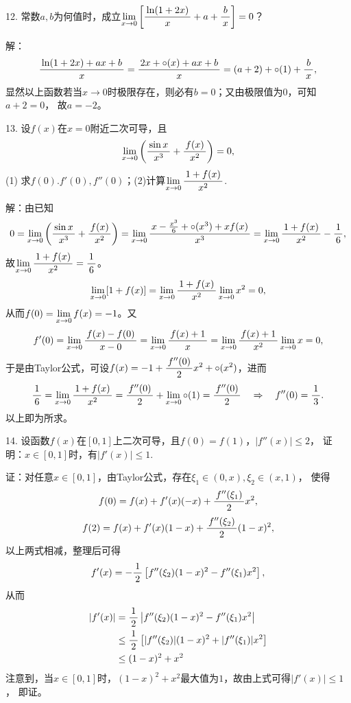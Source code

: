 12. 常数$a,b$为何值时，成立$\limx0\left[\df{\ln(1+2x)}{x}+a
+\df bx\right]=0$？

解：
$$\df{\ln(1+2x)+ax+b}{x}=\df{2x+\circ(x)+ax+b}x=(a+2)+\circ(1)+\df bx,$$
显然以上函数若当$x\to0$时极限存在，则必有$b=0$；又由极限值为$0$，可知$a+2=0$，
故$a=-2$。

\bigskip

13. 设$f(x)$在$x=0$附近二次可导，且
$$\limx0\left(\df{\sin x}{x^3}+\df{f(x)}{x^2}\right)=0,$$
(1) 求$f(0).f'(0),f''(0)$；(2)计算$\limx0\df{1+f(x)}{x^2}$.

解：由已知
$$0=\limx0\left(\df{\sin x}{x^3}+\df{f(x)}{x^2}\right)
=\limx0\df{x-\frac{x^3}6+\circ(x^3)+xf(x)}{x^3}
=\limx0\df{1+f(x)}{x^2}-\df16,$$
故$\limx0\df{1+f(x)}{x^2}=\df16$。
$$\limx0[1+f(x)]=\limx0\df{1+f(x)}{x^2}\limx0x^2=0,$$
从而$f(0)=\limx0f(x)=-1$。又
$$f'(0)=\limx0\df{f(x)-f(0)}{x-0}=\limx0\df{f(x)+1}{x}
=\limx0\df{f(x)+1}{x^2}\limx0x=0,$$
于是由Taylor公式，可设$f(x)=-1+\df{f''(0)}2x^2+\circ(x^2)$，进而
$$\df16=\limx0\df{1+f(x)}{x^2}=\df{f''(0)}2+\limx0\circ(1)
=\df{f''(0)}2\quad\Rightarrow\quad f''(0)=\df13.$$
以上即为所求。

\bigskip

14. 设函数$f(x)$在$[0,1]$上二次可导，且$f(0)=f(1)$，$|f''(x)|\leq2$，
证明：$x\in[0,1]$时，有$|f'(x)|\leq 1$.

证：对任意$x\in[0,1]$，由Taylor公式，存在$\xi_1\in(0,x),\xi_2\in(x,1)$，
使得
$$f(0)=f(x)+f'(x)(-x)+\df{f''(\xi_1)}2x^2,$$
$$f(2)=f(x)+f'(x)(1-x)+\df{f''(\xi_2)}2(1-x)^2,$$
以上两式相减，整理后可得
$$f'(x)=-\df12\left[f''(\xi_2)(1-x)^2-f''(\xi_1)x^2\right],$$
从而
\begin{align}
	|f'(x)|&=\df12\left|f''(\xi_2)(1-x)^2-f''(\xi_1)x^2\right|\notag\\
	&\leq\df12\left[|f''(\xi_2)|(1-x)^2+|f''(\xi_1)|x^2\right]\notag\\
	&\leq(1-x)^2+x^2\notag
\end{align}
注意到，当$x\in[0,1]$时，$(1-x)^2+x^2$最大值为$1$，故由上式可得$|f'(x)|\leq1$，
即证。